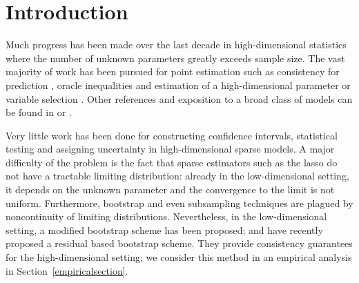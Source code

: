 \documentclass[aos,MSNbibl,dvips]{arximspdf}
\begin{document}
\begin{frontmatter}
%
\begin{keyword}[class=AMS]
\end{keyword}

\begin{keyword}
\end{keyword}
%
\end{frontmatter}

\section{Introduction}\label{sec1}

Much progress has been made over the last decade in high-dimensional
statistics where the number of unknown parameters greatly
exceeds sample size. The vast majority of work has been pursued for point
estimation such as consistency for prediction \cite{greenrit03,pb06}, oracle
inequalities and estimation of a high-dimensional parameter
\cite{cantao07,buneaetal06,zhang2008sparsity,geer07,MY08,brt09,negetal12,judetal11}
or variable selection \cite{mebu06,zhaoyu06,fanlv07,Wai08}. Other
references and exposition to a broad class of models can be found in
\cite{fanlv10} or \cite{pbvdg11}.

Very little work has been done for constructing confidence intervals,
statistical testing and assigning uncertainty in high-dimensional sparse
models. A major difficulty of the problem is the fact that sparse estimators
such as the lasso do not have a tractable limiting distribution:
already in
the low-dimensional setting, it depends on the unknown parameter
\cite{knfu00} and
the convergence to the limit is not uniform. Furthermore, bootstrap and
even subsampling techniques are plagued by noncontinuity of
limiting distributions. Nevertheless, in the low-dimensional setting, a modified
bootstrap scheme has been proposed; \cite{chatter11}
and \cite{chatter13} have recently proposed a residual based
bootstrap scheme. They provide consistency guarantees for the
high-dimensional setting; we consider this method in an empirical analysis
in Section~\ref{empiricalsection}.
\end{document}
